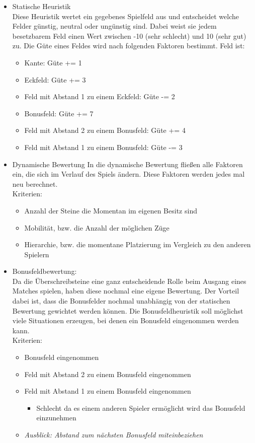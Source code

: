 \documentclass[12pt,a4paper,bibliography=totocnumbered,listof=totocnumbered,ngerman]{scrartcl}
\begin{document}
 \begin{itemize}
 \item Statische Heuristik\\
 Diese Heuristik wertet ein gegebenes Spielfeld aus und entscheidet welche 	 Felder günstig, neutral oder ungünstig sind. Dabei weist sie jedem   besetzbarem Feld einen Wert zwischen -10 (sehr schlecht) und 10 (sehr gut) zu. Die Güte eines Feldes wird nach folgenden Faktoren bestimmt.
Feld ist:

 
 
 	\begin{itemize}
 		\item{Kante: Güte += 1}
 		\item{Eckfeld: Güte += 3}
 		\item{Feld mit Abstand 1 zu einem Eckfeld: Güte -= 2}
 		\item{Bonusfeld: Güte += 7}
 		\item{Feld mit Abstand 2 zu einem Bonusfeld: Güte += 4}
 		\item{Feld mit Abstand 1 zu einem Bonusfeld: Güte -= 3}
 	\end{itemize}
 		
 \item{Dynamische Bewertung}
 In die dynamische Bewertung fließen alle Faktoren ein, die sich im Verlauf des Spiels ändern. Diese Faktoren werden jedes mal neu berechnet.\\
 Kriterien:
  \begin{itemize}
  \item{Anzahl der Steine die Momentan im eigenen Besitz sind}
  \item Mobilität, bzw. die Anzahl der möglichen Züge
  \item Hierarchie, bzw. die momentane Platzierung im Vergleich zu den anderen Spielern
  
  \end{itemize}
  \item Bonusfeldbewertung:\\
  Da die Überschreibsteine eine ganz entscheidende Rolle beim Ausgang eines Matches spielen, haben diese nochmal eine eigene Bewertung. Der Vorteil dabei ist, dass die Bonusfelder nochmal unabhängig von der statischen Bewertung gewichtet werden können. Die Bonusfeldheuristik soll möglichst viele Situationen erzeugen, bei denen ein Bonusfeld eingenommen werden kann.\\
  Kriterien:
  \begin{itemize}
  \item Bonusfeld eingenommen
  \item Feld mit Abstand 2 zu einem Bonusfeld eingenommen
  \item Feld mit Abstand 1 zu einem Bonusfeld eingenommen
  \begin{itemize}
  \item Schlecht da es einem anderen Spieler ermöglicht wird das Bonusfeld einzunehmen
  \end{itemize}
  \item \textit{Ausblick: Abstand zum nächsten Bonusfeld miteinbeziehen}
  \end{itemize}
 \end{itemize}
 
\end{document}
